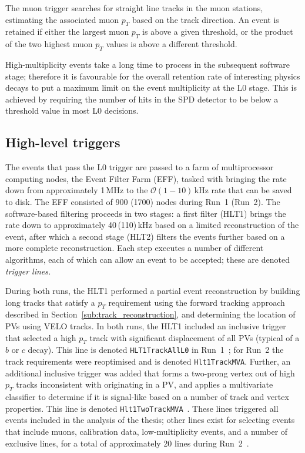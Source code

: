 The muon trigger searches for straight line tracks in the muon stations, estimating the associated muon $p_T$ based on the track direction. An event is retained if either the largest muon $p_T$ is above a given threshold, or the product of the two highest muon $p_T$ values is above a different threshold.

High-multiplicity events take a long time to process in the subsequent software stage; therefore it is favourable for the overall retention rate of interesting physics decays to put a maximum limit on the event multiplicity at the L0 stage. This is achieved by requiring the number of hits in the SPD detector to be below a threshold value in most L0 decisions.


\subsection{High-level triggers} %
\label{sub:high_level_triggers}

The events that pass the L0 trigger are passed to a farm of multiprocessor computing nodes, the Event Filter Farm (EFF), tasked with bringing the rate down from approximately 1\,MHz to the $\mathcal O(1-10)$\,kHz rate that can be saved to disk. The EFF consisted of 900 (1700) nodes during Run~1 (Run~2). The software-based filtering proceeds in two stages: a first filter (HLT1) brings the rate down to approximately 40\,(110)\,kHz based on a limited reconstruction of the event,  after which a second stage  (HLT2) filters the events further based on a more complete reconstruction. Each step executes a number of different algorithms, each of which can allow an event to be accepted; these are denoted \emph{trigger lines.}

During both runs, the HLT1 performed a partial event reconstruction by building long tracks that satisfy a $p_T$ requirement using the forward tracking approach described in Section~\ref{sub:track_reconstruction}, and determining the location of PVs using VELO tracks. In both runs, the HLT1 included an inclusive trigger that selected a high $p_T$ track with significant displacement of all PVs (typical of a $b$ or $c$ decay). This line is denoted \texttt{HLT1TrackAllL0} in Run~1~\cite{Trigger-Performance}; for Run~2 the track requirements were reoptimised and  is denoted \texttt{Hlt1TrackMVA}. Further, an additional inclusive trigger was added that forms a two-prong vertex out of high $p_T$ tracks inconsistent with originating in a PV, and applies a multivariate classifier to determine if it is signal-like based on a number of track and vertex properties. This line is denoted \texttt{Hlt1TwoTrackMVA}~\cite{Trigger-Performance2}. These lines triggered all events included in the analysis of the thesis; other lines exist for selecting events that include muons, calibration data, low-multiplicity events, and a number of exclusive lines, for a total of approximately 20 lines during Run~2~\cite{Trigger-Performance2}.

